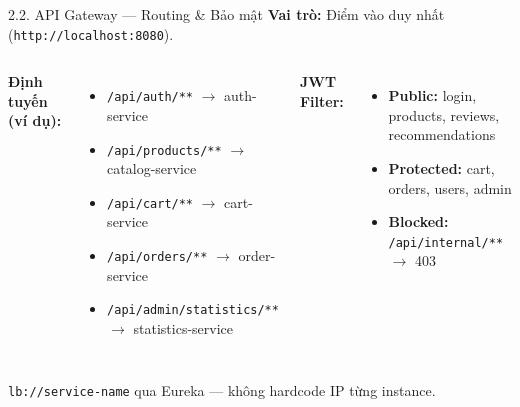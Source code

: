 \documentclass[aspectratio=169,12pt]{beamer}
\begin{document}
\begin{frame}{2.2. API Gateway — Routing \& Bảo mật}
  \textbf{Vai trò:} Điểm vào duy nhất (\texttt{http://localhost:8080}).

  \vspace{0.4em}
  \begin{columns}[T]
    \textbf{Định tuyến (ví dụ):}
    \begin{itemize}\small
      \item \texttt{/api/auth/**} $\rightarrow$ auth-service
      \item \texttt{/api/products/**} $\rightarrow$ catalog-service
      \item \texttt{/api/cart/**} $\rightarrow$ cart-service
      \item \texttt{/api/orders/**} $\rightarrow$ order-service
      \item \texttt{/api/admin/statistics/**} $\rightarrow$ statistics-service
    \end{itemize}

    \textbf{JWT Filter:}
    \begin{itemize}\small
      \item \textbf{Public:} login, products, reviews, recommendations
      \item \textbf{Protected:} cart, orders, users, admin
      \item \textbf{Blocked:} \texttt{/api/internal/**} $\rightarrow$ 403
    \end{itemize}
  \end{columns}

  \vspace{0.5em}
  \texttt{lb://service-name} qua Eureka — không hardcode IP từng instance.
\end{frame}
\end{document}
